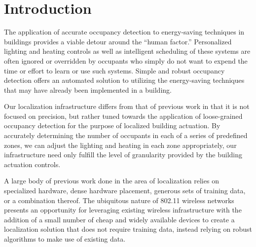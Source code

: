 \section{Introduction}
The application of accurate occupancy detection to energy-saving techniques in buildings provides a viable detour around the ``human factor.'' Personalized lighting and heating controls as well as intelligent scheduling of these systems are often ignored or overridden by occupants who simply do not want to expend the time or effort to learn or use such systems. Simple and robust occupancy detection offers an automated solution to utilizing the energy-saving techniques that may have already been implemented in a building.

Our localization infrastructure differs from that of previous work in that it is not focused on precision, but rather tuned towards the application of loose-grained occupancy detection for the purpose of localized building actuation. By accurately determining the number of occupants in each of a series of predefined zones, we can adjust the lighting and heating in each zone appropriately, our infrastructure need only fulfill the level of granularity provided by the building actuation controls. 

A large body of previous work done in the area of localization relies on specialized hardware, dense hardware placement, generous sets of training data, or a combination thereof. The ubiquitous nature of 802.11 wireless networks presents an opportunity for leveraging existing wireless infrastructure with the addition of a small number of cheap and widely available devices to create a localization solution that does not require training data, instead relying on robust algorithms to make use of existing data.